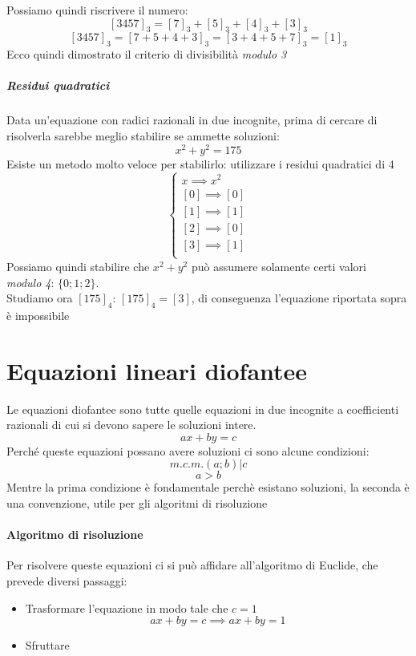 \documentclass[12pt, a4paper,oneside]{report}
\begin{document}
	Possiamo quindi riscrivere il numero:
	\[[3457]_3=[7]_3+[5]_3+[4]_3+[3]_3\]
	\[[3457]_3=[7+5+4+3]_3=[3+4+5+7]_3=[1]_3\]
	Ecco quindi dimostrato il criterio di divisibilità \emph{modulo 3}
	\subparagraph{Residui quadratici}
	Data un'equazione con radici razionali in due incognite, prima di cercare di risolverla sarebbe meglio stabilire se ammette soluzioni:
	\[x^2+y^2=175\]
	Esiste un metodo molto veloce per stabilirlo: utilizzare i residui quadratici di 4
	\[
	\begin{cases}
	x\implies x^2\\
	[0]\implies[0]\\
	[1]\implies[1]\\
	[2]\implies[0]\\
	[3]\implies[1]\\
	\end{cases}
	\]
	Possiamo quindi stabilire che $x^2+y^2$ può assumere solamente certi valori\\ \emph{modulo 4}: $\{0;1;2\}$.\\
	Studiamo ora $[175]_4$: $[175]_4=[3]$, di conseguenza l'equazione riportata sopra è impossibile
		\section{Equazioni lineari diofantee}
	Le equazioni diofantee sono tutte quelle equazioni in due incognite a coefficienti razionali di cui si devono sapere le soluzioni intere.
	\[ax+by=c\]
	Perché queste equazioni possano avere soluzioni ci sono alcune condizioni:
	\[m.c.m.(a; b)|c\]
	\[a>b\]
	Mentre la prima condizione è fondamentale perchè esistano soluzioni, la seconda è una convenzione, utile per gli algoritmi di risoluzione
	\paragraph{Algoritmo di risoluzione}
	Per risolvere queste equazioni ci si può affidare all'algoritmo di Euclide, che prevede diversi passaggi:
	\begin{itemize}
		\item Trasformare l'equazione in modo tale che $c=1$
		\[ax+by=c\implies ax+by=1\]
		\item Sfruttare 
	\end{itemize}
\end{document}
